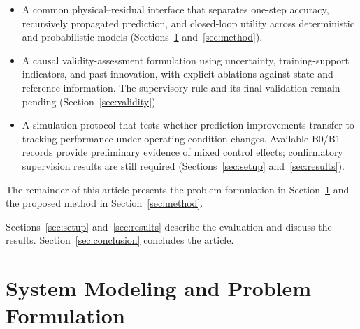 \documentclass[10pt,journal]{IEEEtran}
\newif\ifIncludeTheory
\begin{document}
\begin{itemize}
  \item A common physical--residual interface that separates one-step accuracy, recursively propagated prediction, and closed-loop utility across deterministic and probabilistic models (Sections~\ref{sec:problem} and~\ref{sec:method}).
  \item A causal validity-assessment formulation using uncertainty, training-support indicators, and past innovation, with explicit ablations against state and reference information. The supervisory rule and its final validation remain pending (Section~\ref{sec:validity}).
  \item A simulation protocol that tests whether prediction improvements transfer to tracking performance under operating-condition changes. Available B0/B1 records provide preliminary evidence of mixed control effects; confirmatory supervision results are still required (Sections~\ref{sec:setup} and~\ref{sec:results}).
\end{itemize}

The remainder of this article presents the problem formulation in
Section~\ref{sec:problem} and the proposed method in
Section~\ref{sec:method}.
\ifIncludeTheory
Section~\ref{sec:theory} develops the theoretical analysis.
\fi
Sections~\ref{sec:setup} and~\ref{sec:results} describe the evaluation
and discuss the results. Section~\ref{sec:conclusion} concludes the article.

\section{System Modeling and Problem Formulation}
\label{sec:problem}
\end{document}
